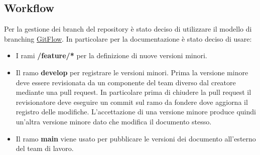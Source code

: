 \documentclass[a4paper, 12pt]{article}
\begin{document}
    \subsection{Workflow}
    Per la gestione dei branch del repository è stato deciso di utilizzare il modello di branching \href{https://www.atlassian.com/it/git/tutorials/comparing-workflows/gitflow-workflow}{GitFlow}.
    In particolare per la documentazione è stato deciso di usare:
    \begin{itemize}
        \item I rami \textbf{/feature/*} per la definizione di nuove versioni minori.
        \item Il ramo \textbf{develop} per registrare le versioni minori.
        Prima la versione minore deve essere revisionata da un componente del team diverso dal creatore mediante una pull request.
        In particolare prima di chiudere la pull request  il revisionatore deve eseguire un commit sul ramo da fondere dove aggiorna il registro delle modifiche.
        L’accettazione di una versione minore produce quindi un’altra versione minore dato che modifica il documento stesso.
        \item Il ramo \textbf{main} viene usato per pubblicare le versioni dei documento all’esterno del team di lavoro.
    \end{itemize}
\end{document}
